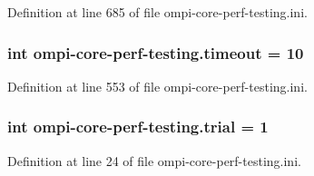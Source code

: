 Definition at line 685 of file ompi-\/core-\/perf-\/testing.\-ini.

\hypertarget{namespaceompi-core-perf-testing_a53171e21f7f78c9829e3273166f9ead7}{
\subsubsection[{timeout}]{\setlength{\rightskip}{0pt plus 5cm}int ompi-\/core-\/perf-\/testing.\-timeout = 10}}\label{namespaceompi-core-perf-testing_a53171e21f7f78c9829e3273166f9ead7}


Definition at line 553 of file ompi-\/core-\/perf-\/testing.\-ini.

\hypertarget{namespaceompi-core-perf-testing_a44334128c3f66cfb2779cf372d7021fa}{
\subsubsection[{trial}]{\setlength{\rightskip}{0pt plus 5cm}int ompi-\/core-\/perf-\/testing.\-trial = 1}}\label{namespaceompi-core-perf-testing_a44334128c3f66cfb2779cf372d7021fa}


Definition at line 24 of file ompi-\/core-\/perf-\/testing.\-ini.

